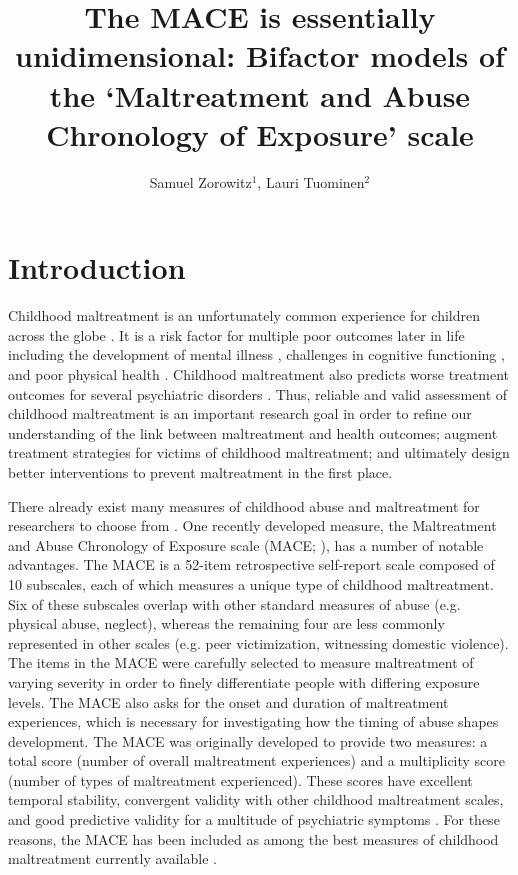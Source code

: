 \documentclass[letterpaper,man,natbib,noextraspace,floatsintext,longtable]{apa6}
\title{The MACE is essentially unidimensional: Bifactor models of the `Maltreatment and Abuse Chronology of Exposure' scale}
\author{Samuel Zorowitz$^1$, Lauri Tuominen$^{2}$}
\affiliation{$^1$Princeton Neuroscience Institute, Princeton University, USA\\$^2$The Royal’s Institute of Mental Health Research, University of Ottawa, Canada}
\begin{document}
\maketitle

\section{Introduction}

Childhood maltreatment is an unfortunately common experience for children across the globe \citep{stoltenborgh2015prevalence}. It is a risk factor for multiple poor outcomes later in life including the development of mental illness \citep{kessler2010childhood}, challenges in cognitive functioning \citep{su2019does}, and poor physical health \citep{wegman2009meta}. Childhood maltreatment also predicts worse treatment outcomes for several psychiatric disorders \citep{nanni2012childhood, thomas2019childhood}. Thus, reliable and valid assessment of childhood maltreatment is an important research goal in order to refine our understanding of the link between maltreatment and health outcomes; augment treatment strategies for victims of childhood maltreatment; and ultimately design better interventions to prevent maltreatment in the first place. 

There already exist many measures of childhood abuse and maltreatment for researchers to choose from \citep{saini2019systematic}. One recently developed measure, the Maltreatment and Abuse Chronology of Exposure scale (MACE; \citealt{teicher2015maltreatment}), has a number of notable advantages. The MACE is a 52-item retrospective self-report scale composed of 10 subscales, each of which measures a unique type of childhood maltreatment. Six of these subscales overlap with other standard measures of abuse (e.g. physical abuse, neglect), whereas the remaining four are less commonly represented in other scales (e.g. peer victimization, witnessing domestic violence). The items in the MACE were carefully selected to measure maltreatment of varying severity in order to finely differentiate people with differing exposure levels. The MACE also asks for the onset and duration of maltreatment experiences, which is necessary for investigating how the timing of abuse shapes development. The MACE was originally developed to provide two measures: a total score (number of overall maltreatment experiences) and a multiplicity score (number of types of maltreatment experienced). These scores have excellent temporal stability, convergent validity with other childhood maltreatment scales, and good predictive validity for a multitude of psychiatric symptoms \citep{teicher2015maltreatment}. For these reasons, the MACE has been included as among the best measures of childhood maltreatment currently available \citep{saini2019systematic, georgieva2022systematic}.
\end{document}
